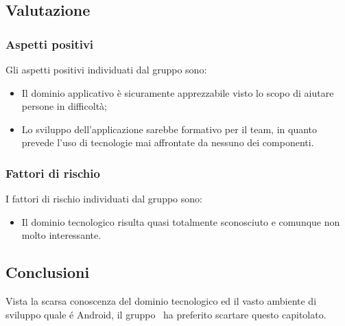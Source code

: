\documentclass[../StudioDiFattibilita.tex]{subfiles}
\begin{document}
		\subsection{Valutazione}
			\subsubsection{Aspetti positivi}
				Gli aspetti positivi individuati dal gruppo sono:
					\begin{itemize}
						\item Il dominio applicativo è sicuramente apprezzabile visto lo scopo di aiutare persone
						in difficoltà;
						\item Lo sviluppo dell'applicazione sarebbe formativo per il team, in quanto prevede l'uso di tecnologie mai affrontate da nessuno dei componenti.
					\end{itemize}
			\subsubsection{Fattori di rischio}
				I fattori di rischio individuati dal gruppo sono:
				\begin{itemize}
					\item Il dominio tecnologico risulta quasi totalmente sconosciuto e comunque non molto
					interessante.
				\end{itemize}
			\subsection{Conclusioni}
				Vista la scarsa conoscenza del dominio tecnologico ed il vasto ambiente di sviluppo quale é
				Android, il gruppo \kaleidoscode\ ha preferito scartare questo capitolato.
\end{document}
